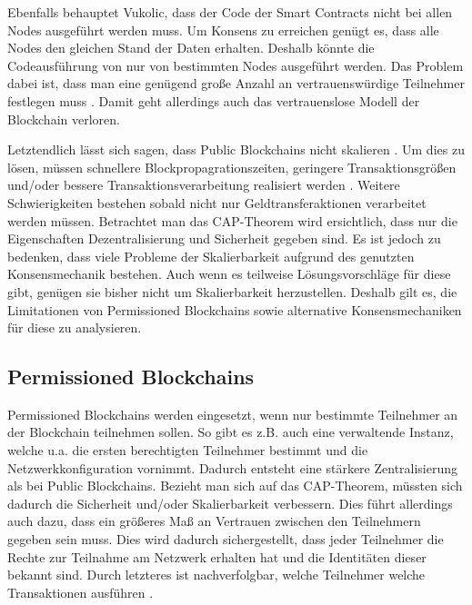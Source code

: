 Ebenfalls behauptet Vukolic, dass der Code der Smart Contracts nicht bei allen Nodes ausgeführt werden muss. Um Konsens zu erreichen genügt es, dass alle Nodes den gleichen Stand der Daten erhalten. Deshalb könnte die Codeausführung von nur von bestimmten Nodes ausgeführt werden. Das Problem dabei ist, dass man eine genügend große Anzahl an vertrauenswürdige Teilnehmer festlegen muss \cite{VukolicRethinkingPermissionedBlockchains2017}. Damit geht allerdings auch das vertrauenslose Modell der Blockchain verloren.

Letztendlich lässt sich sagen, dass Public Blockchains nicht skalieren . Um dies zu lösen, müssen  schnellere Blockpropagrationszeiten, geringere Transaktionsgrößen und/oder bessere Transaktionsverarbeitung realisiert werden \cite{SchererPerformanceScalabilityBlockchain2017}. Weitere Schwierigkeiten bestehen sobald nicht nur Geldtransferaktionen verarbeitet werden müssen. Betrachtet man das CAP-Theorem wird ersichtlich, dass nur die Eigenschaften Dezentralisierung und Sicherheit gegeben sind. Es ist jedoch zu bedenken, dass viele Probleme der Skalierbarkeit aufgrund des genutzten Konsensmechanik bestehen. Auch wenn es teilweise Lösungsvorschläge für diese gibt, genügen sie bisher nicht um Skalierbarkeit herzustellen. Deshalb gilt es, die Limitationen von Permissioned Blockchains sowie alternative Konsensmechaniken für diese zu analysieren.


\subsection{Permissioned Blockchains}
Permissioned Blockchains werden eingesetzt, wenn nur bestimmte Teilnehmer an der Blockchain teilnehmen sollen. So gibt es z.B. auch eine verwaltende Instanz, welche u.a. die ersten berechtigten Teilnehmer bestimmt und die Netzwerkkonfiguration vornimmt. Dadurch entsteht eine stärkere Zentralisierung als bei Public Blockchains. Bezieht man sich auf das CAP-Theorem, müssten sich dadurch die Sicherheit und/oder Skalierbarkeit verbessern. Dies führt allerdings auch dazu, dass ein größeres Maß an Vertrauen zwischen den Teilnehmern gegeben sein muss. Dies wird dadurch sichergestellt, dass jeder Teilnehmer die Rechte zur Teilnahme am Netzwerk erhalten hat und die Identitäten dieser bekannt sind. Durch letzteres ist nachverfolgbar, welche Teilnehmer welche Transaktionen ausführen \cite{SchererPerformanceScalabilityBlockchain2017}.

